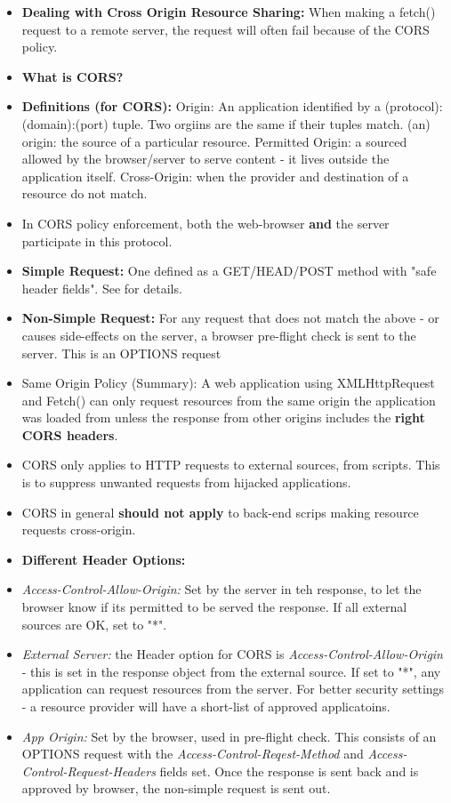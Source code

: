 \documentclass[8pt,a4paper]{extarticle}
\begin{document}
\begin{itemize}
\item \textbf{Dealing with Cross Origin Resource Sharing:} When making a fetch() request to a remote server, the request will often fail because of the CORS policy. 
\item \textbf{What is CORS?}
\item \textbf{Definitions (for CORS):}
\mitem Origin: An application identified by a (protocol):(domain):(port) tuple. Two orgiins are the same if their tuples match.
\mitem (an) origin: the source of a particular resource.
\mitem Permitted Origin: a sourced allowed by the browser/server to serve content - it lives outside the application itself.
\mitem Cross-Origin: when the provider and destination of a resource do not match.
\item In CORS policy enforcement, both the web-browser \textbf{and} the server participate in this protocol. 
\item \textbf{Simple Request:} One defined as a GET/HEAD/POST method with "safe header fields". See \cite{cors} for details.
\item \textbf{Non-Simple Request:} For any request that does not match the above - or causes side-effects on the server, a browser pre-flight check is sent to the server. This is an OPTIONS request
\item Same Origin Policy (Summary): A web application using XMLHttpRequest and Fetch() can only request resources from the same origin the application was loaded from unless the response from other origins includes the \textbf{right CORS headers}.
\item CORS only applies to HTTP requests to external sources, from scripts. This is to suppress unwanted requests from hijacked applications.
\item CORS in general \textbf{should not apply} to back-end scrips making resource requests cross-origin.
\item \textbf{Different Header Options:}
\item \textit{Access-Control-Allow-Origin:} Set by the server in teh response, to let the browser know if its permitted to be served the response. If all external sources are OK, set to "*".
\item \textit{External Server:} the Header option for CORS is \textit{Access-Control-Allow-Origin} - this is set in the response object from the external source. If set to "*", any application can request resources from the server. For better security settings - a resource provider will have a short-list of approved applicatoins.
\item \textit{App Origin:} Set by the browser, used in pre-flight check. This consists of an OPTIONS request with the \textit{Access-Control-Reqest-Method} and \textit{Access-Control-Request-Headers} fields set. Once the response is sent back and is approved by browser, the non-simple request is sent out.


\end{itemize}
\end{document}
